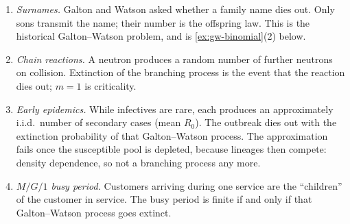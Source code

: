 \documentclass[11pt,a4paper]{article}
\begin{document}
\begin{example}
\label{ex:branching-applications}
\begin{enumerate}[label=\textup{(\arabic*)}]
    \item
    \emph{Surnames.} Galton and Watson asked whether a family name dies out. Only sons transmit the name; their number is the offspring law. This is the historical Galton--Watson problem, and is \cref{ex:gw-binomial}(2) below.
    \item
    \emph{Chain reactions.} A neutron produces a random number of further neutrons on collision. Extinction of the branching process is the event that the reaction dies out; \(m=1\) is criticality.
    \item
    \emph{Early epidemics.} While infectives are rare, each produces an approximately i.i.d.\ number of secondary cases (mean \(R_0\)). The outbreak dies out with the extinction probability of that Galton--Watson process. The approximation fails once the susceptible pool is depleted, because lineages then compete: density dependence, so not a branching process any more.
    \item
    \emph{\(M/G/1\) busy period.} Customers arriving during one service are the ``children'' of the customer in service. The busy period is finite if and only if that Galton--Watson process goes extinct.
\end{enumerate}
\end{example}
\end{document}
